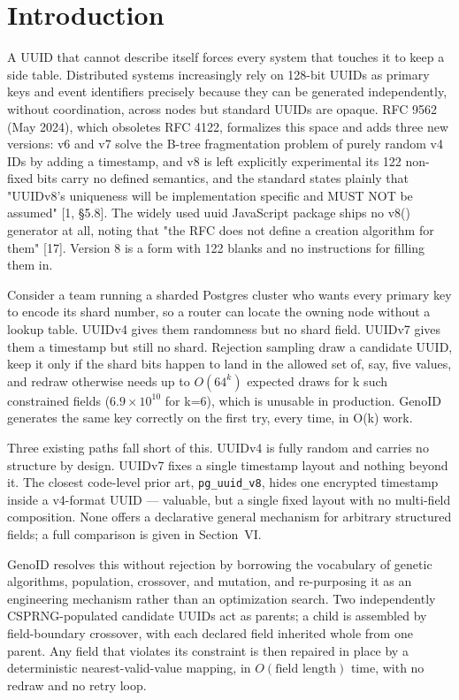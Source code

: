\documentclass[conference]{IEEEtran}
\begin{document}
\section{Introduction}
A UUID that cannot describe itself forces every system that touches it to keep a side table. Distributed systems increasingly rely on 128-bit UUIDs as primary keys and event identifiers precisely because they can be generated independently, without coordination, across nodes but standard UUIDs are opaque. RFC 9562 (May 2024), which obsoletes RFC 4122, formalizes this space and adds three new versions: v6 and v7 solve the B-tree fragmentation problem of purely random v4 IDs by adding a timestamp, and v8 is left explicitly experimental its 122 non-fixed bits carry no defined semantics, and the standard states plainly that "UUIDv8's uniqueness will be implementation specific and MUST NOT be assumed" [1, §5.8]. The widely used uuid JavaScript package ships no v8() generator at all, noting that "the RFC does not define a creation algorithm for them" [17]. Version 8 is a form with 122 blanks and no instructions for filling them in.

Consider a team running a sharded Postgres cluster who wants every primary key to encode its shard number, so a router can locate the owning node without a lookup table. UUIDv4 gives them randomness but no shard field. UUIDv7 gives them a timestamp but still no shard. Rejection sampling draw a candidate UUID, keep it only if the shard bits happen to land in the allowed set of, say, five values, and redraw otherwise needs up to $O(64^k)$ expected draws for k such constrained fields ($6.9\times10^{10}$ for k=6), which is unusable in production. GenoID generates the same key correctly on the first try, every time, in O(k) work.

Three existing paths fall short of this. UUIDv4 is fully random and carries no structure by design. UUIDv7 fixes a single timestamp layout and nothing beyond it. The closest code-level prior art, \texttt{pg\_uuid\_v8}, hides one encrypted timestamp inside a v4-format UUID — valuable, but a single fixed layout with no multi-field composition. None offers a declarative general mechanism for arbitrary structured fields; a full comparison is given in Section~VI.

GenoID resolves this without rejection by borrowing the vocabulary of genetic algorithms, population, crossover, and mutation, and re-purposing it as an engineering mechanism rather than an optimization search. Two independently CSPRNG-populated candidate UUIDs act as parents; a child is assembled by field-boundary crossover, with each declared field inherited whole from one parent. Any field that violates its constraint is then repaired in place by a deterministic nearest-valid-value mapping, in $O(\text{field length})$ time, with no redraw and no retry loop.
\end{document}

